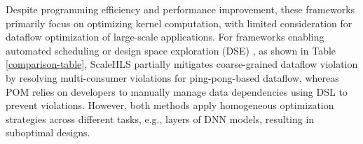 \documentclass[conference]{IEEEtran}
\begin{document}
Despite programming efficiency and performance improvement, these frameworks primarily focus on optimizing kernel computation,
with limited consideration for dataflow optimization of large-scale applications.
For frameworks enabling automated scheduling or design space exploration (DSE) \cite{zhang2024pom, ye2022scalehls}, as shown in Table \ref{comparison-table}, 
ScaleHLS partially mitigates coarse-grained dataflow violation by resolving multi-consumer violations for ping-pong-based dataflow, whereas POM relies on developers to manually manage data dependencies using DSL to prevent violations. However, both methods apply homogeneous optimization strategies across different tasks, e.g., layers of DNN models, resulting in suboptimal designs.
\end{document}
